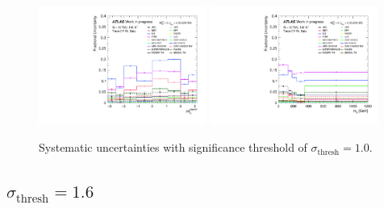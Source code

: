 \begin{figure}[H]
    \includegraphics[width=0.49\textwidth]{plots/diffx/sigthresholds/1p0/Systematic_Uncertainties_data_lepgam_dphi_3cr_QCD_Sh2211_1p0sigma.pdf}
    \includegraphics[width=0.49\textwidth]{plots/diffx/sigthresholds/1p0/Systematic_Uncertainties_data_ly_m_3cr_QCD_Sh2211_1p0sigma.pdf}
    \caption{Systematic uncertainties with significance threshold of $\sigma_{\text{thresh}}=1.0$.\label{fig:app:thresholdone}}
\end{figure}

\subsection{$\sigma_{\text{thresh}}=1.6$}


